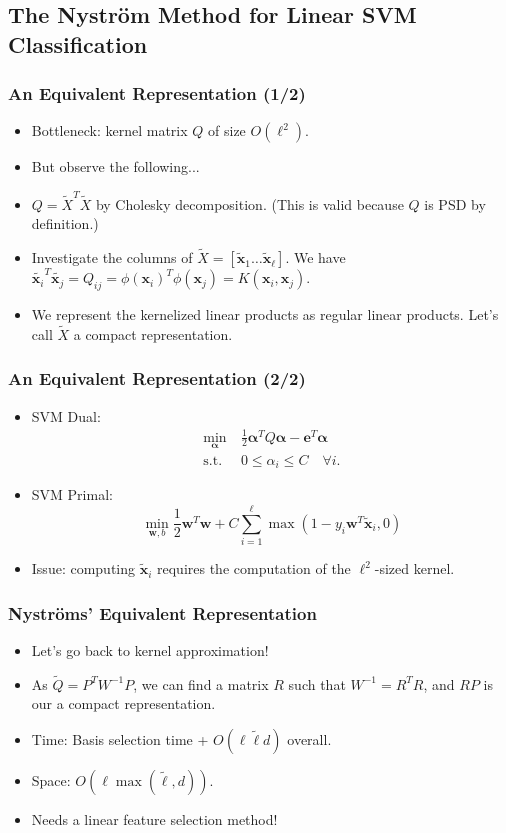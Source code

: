 \documentclass{beamer}
\def\bw{{\boldsymbol w}}
\def\balpha{{\boldsymbol \alpha}}
\def\be{{\boldsymbol e}}
\def\bx{{\boldsymbol x}}
\def\x{{\mathbf x}}
\begin{document}
\subsection{The Nystr\"om Method for Linear SVM Classification}
\begin{frame}
  \frametitle{An Equivalent Representation (1/2)}
  \begin{itemize}
    \item Bottleneck: kernel matrix $Q$ of size $O(\ell^2)$.
    \item [] But observe the following...
    \pause
    \item $Q = \tilde{X}^T\tilde{X}$ by Cholesky decomposition. (This is valid because $Q$ is PSD by definition.)
    \item Investigate the columns of $\tilde{X} = [\tilde{\bx}_1 \dots \tilde{\bx}_\ell]$. We have 
    $
    \tilde{\bx_i}^T \tilde{\bx_j} = 
    Q_{ij} = 
    \phi(\bx_i)^T \phi(\x_j) = K(\bx_i,\bx_j) 
    $.
    \pause
    \item We represent the kernelized linear products as regular linear products. Let's call $\tilde{X}$ a compact representation. 
  \end{itemize}
\end{frame}

\begin{frame}
  \frametitle{An Equivalent Representation (2/2)}
  \begin{itemize}
    \item SVM Dual: 
    \begin{align}
    \min_{\balpha} \  &  \frac{1}{2} \balpha^T Q  \balpha - \be^T \balpha \nonumber \\
    \mbox{s.t.} \  & 0 \le \alpha_i \le C \quad \forall i \mbox{.} \nonumber
    \end{align}
    \pause
    \item SVM Primal:
    \begin{equation}
      \min_{\bw, b}
      \frac{1}{2} \bw^T\bw + C\sum_{i=1}^\ell \max(1-y_i\bw^T\tilde{\bx}_i, 0) \nonumber
    \end{equation} 
    \pause
    \item Issue: computing $\tilde{\bx}_i$ requires the computation of the $\ell^2$-sized kernel.
  \end{itemize}
\end{frame}

\begin{frame}
  \frametitle{Nystr\"oms' Equivalent Representation}
  \begin{itemize}
    \item Let's go back to kernel approximation!
    \pause
    \item As $\tilde{Q} = P^TW^{-1}P$, we can find a matrix $R$ such that $W^{-1} = R^TR$, and $RP$ is our a compact representation.
    \pause
    \item [] Time: Basis selection time + $O(\ell \tilde{\ell} d)$ overall.
    \item [] Space: $O(\ell \max(\tilde{\ell}, d))$.
    \pause
    \item Needs a linear feature selection method!
  \end{itemize}
\end{frame}
\end{document}
